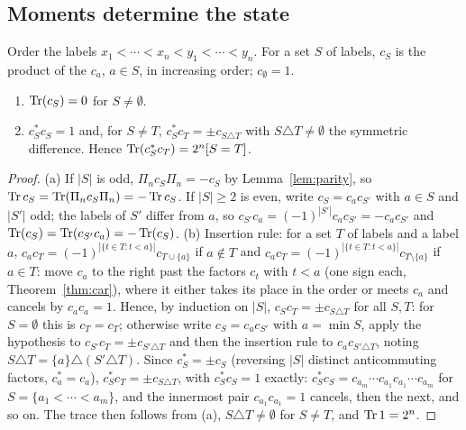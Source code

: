 \subsection{Moments determine the state}
\label{sec:monomials}

\begin{definition}\label{def:monomial}
Order the labels $x_1<\cdots<x_n<y_1<\cdots<y_n$. For a set $S$ of labels, $c_S$ is the product
of the $c_a$, $a\in S$, in increasing order; $c_\emptyset=1$.
\end{definition}

\begin{lemma}\label{lem:monomial-trace}
\begin{enumerate}
\item[(a)] $\operatorname{Tr}(c_S)=0$ for $S\neq\emptyset$.
\item[(b)] $c_S^*c_S=1$ and, for $S\neq T$, $c_S^*c_T=\pm c_{S\triangle T}$ with
$S\triangle T\neq\emptyset$ the symmetric difference. Hence $\operatorname{Tr}(c_S^*c_T)=2^n[S=T]$.
\end{enumerate}
\end{lemma}
\begin{proof}
(a) If $|S|$ is odd, $\Pi_nc_S\Pi_n=-c_S$ by Lemma~\ref{lem:parity}, so
$\operatorname{Tr} c_S=\operatorname{Tr}(\Pi_nc_S\Pi_n)=-\operatorname{Tr} c_S$. If $|S|\geq2$ is even, write $c_S=c_ac_{S'}$ with $a\in S$
and
$|S'|$ odd; the labels of $S'$ differ from $a$, so $c_{S'}c_a=(-1)^{|S'|}c_ac_{S'}=-c_ac_{S'}$
and $\operatorname{Tr}(c_S)=\operatorname{Tr}(c_{S'}c_a)=-\operatorname{Tr}(c_S)$.
(b) Insertion rule: for a set $T$ of labels and a label $a$,
$c_ac_T=(-1)^{|\{t\in T:t<a\}|}c_{T\cup\{a\}}$ if $a\notin T$ and
$c_ac_T=(-1)^{|\{t\in T:t<a\}|}c_{T\setminus\{a\}}$ if $a\in T$: move $c_a$ to the right past
the factors $c_t$ with $t<a$ (one sign each, Theorem~\ref{thm:car}), where it either takes
its place in the order or meets $c_a$ and cancels by $c_ac_a=1$. Hence, by induction on $|S|$,
$c_Sc_T=\pm c_{S\triangle T}$ for all $S,T$: for $S=\emptyset$ this is $c_T=c_T$; otherwise
write $c_S=c_ac_{S'}$ with $a=\min S$, apply the
hypothesis to $c_{S'}c_T=\pm c_{S'\triangle T}$ and then the insertion rule to
$c_ac_{S'\triangle T}$, noting $S\triangle T=\{a\}\triangle(S'\triangle T)$. Since
$c_S^*=\pm c_S$ (reversing $|S|$ distinct anticommuting factors, $c_a^*=c_a$),
$c_S^*c_T=\pm c_{S\triangle T}$, with $c_S^*c_S=1$ exactly: $c_S^*c_S=c_{a_m}\cdots c_{a_1}c_{a_1}\cdots c_{a_m}$ for
$S=\{a_1<\cdots<a_m\}$, and the innermost pair $c_{a_1}c_{a_1}=1$ cancels, then the next, and
so on. The trace then follows from (a), $S\triangle T\neq\emptyset$ for $S\neq T$, and
$\operatorname{Tr}1=2^n$.
\end{proof}

